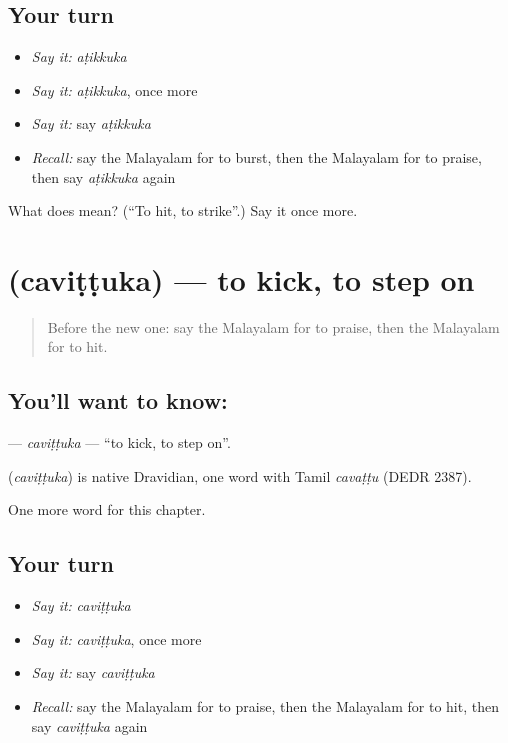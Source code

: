 \subsection*{Your turn}
\begin{itemize}
\raggedright
  \item \emph{Say it:} \emph{aṭikkuka}
  \item \emph{Say it:} \emph{aṭikkuka}, once more
  \item \emph{Say it:} say \emph{aṭikkuka}
  \item \emph{Recall:} say the Malayalam for to burst, then the Malayalam for to praise, then say \emph{aṭikkuka} again
\end{itemize}

\begin{tcolorbox}[breakable,colback=teal!4,colframe=teal!35!black,title={Before you move on}]
What does  mean? (\textquotedblleft{}To hit, to strike\textquotedblright{}.) Say it once more.
\end{tcolorbox}
\section[\texorpdfstring{\ml{ചവിട്ടുക} (caviṭṭuka)}{ചവിട്ടുക (caviṭṭuka)}]{ (caviṭṭuka) — to kick, to step on}

\label{lesson:ML-C308-cavittuka}



\begin{quote}
Before the new one: say the Malayalam for to praise, then the Malayalam for to hit.
\end{quote}

\subsection*{You'll want to know: }
\textbf{} — \emph{caviṭṭuka} — \textquotedblleft{}to kick, to step on\textquotedblright{}.

\begin{cousinweb}
\textbf{} (\emph{caviṭṭuka}) is native Dravidian, one word with Tamil \emph{cavaṭṭu} (DEDR 2387).
\end{cousinweb}

\begin{grammarlens}[title={What you've built}]
One more word for this chapter.
\end{grammarlens}

\subsection*{Your turn}
\begin{itemize}
\raggedright
  \item \emph{Say it:} \emph{caviṭṭuka}
  \item \emph{Say it:} \emph{caviṭṭuka}, once more
  \item \emph{Say it:} say \emph{caviṭṭuka}
  \item \emph{Recall:} say the Malayalam for to praise, then the Malayalam for to hit, then say \emph{caviṭṭuka} again
\end{itemize}

